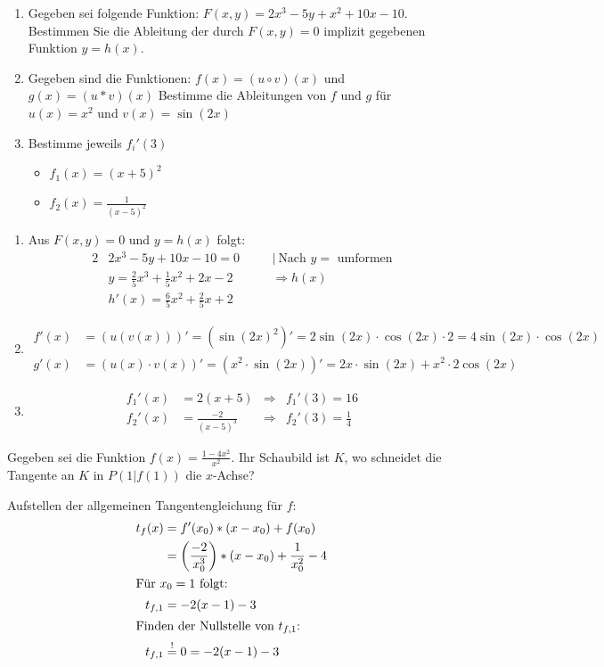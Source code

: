 \begin{enumerate}
	\item Gegeben sei folgende Funktion: $F(x,y)=2x^3-5y+x^2+10x-10$. Bestimmen Sie die Ableitung der durch $F(x,y)=0$ implizit gegebenen Funktion $y=h(x)$.
	\item Gegeben sind die Funktionen:
	$f(x) = (u \circ v)(x)$ und $g(x) = (u* v)(x)$
	Bestimme die Ableitungen von $f$ und $g$ für $u(x)=x^2$ und $v(x)=\sin(2x)$
	\item Bestimme jeweils $f_i'(3)$
	\begin{itemize}
		\item $f_1(x) = (x+5)^2$
		\item $f_2(x) = \frac{1}{(x-5)^2}$
	\end{itemize}
\end{enumerate}
\begin{lsg}{}
	\begin{enumerate}
		\item Aus $F(x,y)=0$ und $y=h(x)$ folgt:\begin{alignat*}{2}
		&2x^3-5y+10x-10=0\quad&&|\ \text{Nach $y=$ umformen}\\
		&y=\frac{2}{5} x^3+\frac{1}{5} x^2+2x-2 &&\Rightarrow h(x)\\
		&h'(x)=\frac{6}{5} x^2+\frac{2}{5}x+2
		\end{alignat*}
		\item \begin{align*}
		f'(x)&=\left(u(v(x))\right)'=\left({\sin(2x)}^2\right)'=2\sin(2x)\cdot \cos(2x) \cdot 2=4\sin(2x)\cdot \cos(2x)\\
		g'(x)&=(u(x)\cdot v(x))'=\left(x^2\cdot \sin(2x)\right)'=2x\cdot \sin(2x)+x^2\cdot 2\cos(2x)
		\end{align*}
		\item \begin{align*}
		f_1'(x)&=2(x+5)&\Rightarrow  &f_1'(3)=16\\
		f_2'(x)&=\frac{-2}{(x-5)^3}&\Rightarrow &f_2'(3)=\frac{1}{4}
		\end{align*}
	\end{enumerate}
\end{lsg}




Gegeben sei die Funktion $f(x) = \frac{1-4x^2}{x^2}$. Ihr Schaubild ist $K$, wo schneidet die Tangente an $K$ in $P(1|f(1))$ die $x$-Achse?
\begin{lsg}{}
	Aufstellen der allgemeinen Tangentengleichung für $f$:
	\begin{align*}
		t_f(x)&=f'(x_0)*(x-x_0)+f(x_0)\\
					&=\left(\frac{-2}{x_0^3}\right)*(x-x_0)+\frac{1}{x_0^2}-4\\
		\intertext{Für $x_0=1$ folgt:}
		t_{f,1}&=-2(x-1)-3\\
		\intertext{Finden der Nullstelle von $t_{f,1}$:}
		t_{f,1}&\overset!=0=-2(x-1)-3\\
	\end{align*}
\end{lsg}



